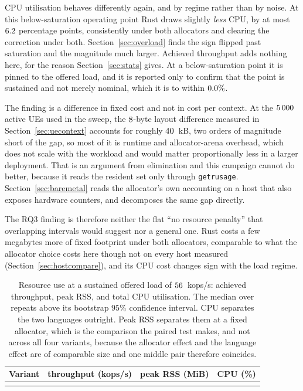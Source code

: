 \documentclass[english,oneside,a4paper,censored,csm,software-track-2020]{HYthesisML}
\begin{document}
CPU utilisation behaves differently again, and by regime rather than by noise.
At this below-saturation operating point Rust draws slightly \emph{less} CPU, by
at most $6.2$ percentage points, consistently under both allocators and clearing the
correction under both. Section~\ref{sec:overload} finds the sign flipped past saturation and the
magnitude much larger. Achieved throughput adds nothing here, for the reason
Section~\ref{sec:stats} gives. At a below-saturation point it is pinned to the offered load, and
it is reported only to confirm that the point is sustained and not merely nominal, which it is to
within $0.0\%$.

The finding is a difference in fixed cost and not in cost per context. At the $5\,000$ active
UEs used in the sweep, the $8$-byte layout difference measured in
Section~\ref{sec:uecontext} accounts for roughly $40$~kB, two orders of magnitude
short of the gap, so most of it is runtime and allocator-arena overhead, which does not scale with
the workload and would matter proportionally less in a larger deployment. That is an argument from
elimination and this campaign cannot do better, because it reads the resident set only through
\texttt{getrusage}. Section~\ref{sec:baremetal} reads the allocator's own accounting on a host that
also exposes hardware counters, and decomposes the same gap directly.

The RQ3 finding is therefore neither the flat ``no resource penalty'' that overlapping intervals
would suggest nor a general one. Rust costs a few megabytes more of fixed footprint under both
allocators, comparable to what the allocator choice costs here though not on every host measured
(Section~\ref{sec:hostcompare}), and its CPU cost changes sign with the load regime.

\begin{table}[H]
\centering
\small
\caption[Resource use at the representative load]{Resource use at a sustained offered load of $56$~kops/s: achieved throughput,
peak RSS, and total CPU utilisation. The median over \NRepeats{} repeats above its bootstrap
$95\%$ confidence interval. CPU separates the two languages outright. Peak RSS separates them at a
fixed allocator, which is the comparison the paired test makes, and not across all four variants,
because the allocator effect and the language effect are of comparable size and one middle pair
therefore coincides.\label{tab:resource}}
\begin{tabular}{@{}l r r r@{}}
\hline\hline
Variant & throughput (kops/s) & peak RSS (MiB) & CPU (\%) \\
\hline
\\
\hline
\end{tabular}
\end{table}
\end{document}
